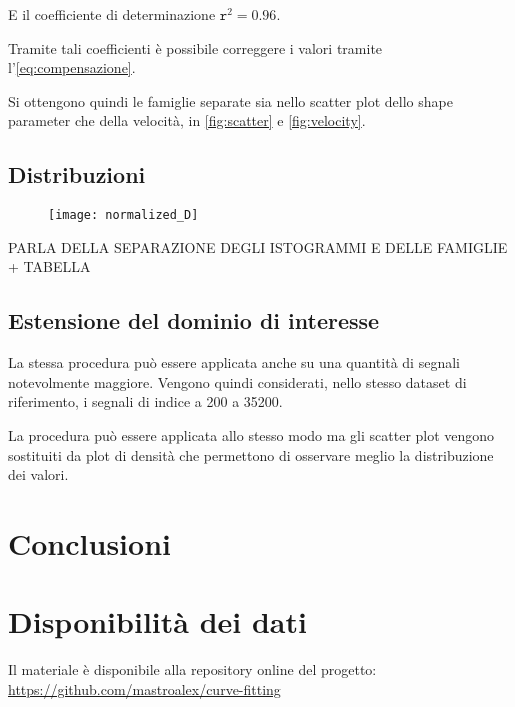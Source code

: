 E il coefficiente di determinazione $\mathtt{r}^2=0.96$. 

Tramite tali coefficienti è possibile correggere i valori tramite l'\cref{eq:compensazione}.

Si ottengono quindi le famiglie separate sia nello scatter plot dello shape parameter che della velocità, in \cref{fig:scatter} e \cref{fig:velocity}.


\textcolor{blue}{\lipsum[1-2]}

\subsection{Distribuzioni}

\begin{figure}[b!]
	\centering
	\texttt{[image: normalized\_D]}
	\caption{}
	\label{fig:normalizedDensity}
\end{figure}



PARLA DELLA SEPARAZIONE DEGLI ISTOGRAMMI E DELLE FAMIGLIE + TABELLA



\subsection{Estensione del dominio di interesse}




La stessa procedura può essere applicata anche su una quantità di segnali notevolmente maggiore. Vengono quindi considerati, nello stesso dataset di riferimento, i segnali di indice a 200 a 35200. 

La procedura può essere applicata allo stesso modo ma gli scatter plot vengono sostituiti da plot di densità che permettono di osservare meglio la distribuzione dei valori.


\section{Conclusioni}
\textcolor{blue}{\lipsum[1]}

\pagebreak
\section*{Disponibilità dei dati}

Il materiale è disponibile alla repository online del progetto: \url{https://github.com/mastroalex/curve-fitting}


\raggedbottom
\printbibliography[title=Riferimenti]






